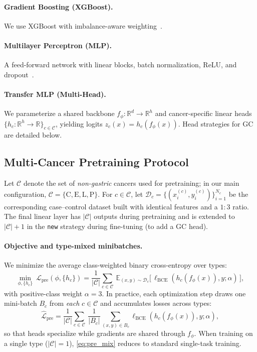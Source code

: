 \documentclass[journal,article,submit,pdftex,moreauthors]{Definitions/mdpi}
\begin{document}
\paragraph{Gradient Boosting (XGBoost).} We use XGBoost with imbalance-aware weighting~\citep{Chen2016_XGBoost}.

\paragraph{Multilayer Perceptron (MLP).} A feed-forward network with linear blocks, batch normalization, ReLU, and dropout~\citep{Ioffe2015_BN,Srivastava2014_Dropout}.

\paragraph{Transfer MLP (Multi-Head).}
We parameterize a shared backbone $f_\phi:\mathbb{R}^d\!\to\!\mathbb{R}^h$ and cancer-specific linear heads $\{h_c:\mathbb{R}^h\!\to\!\mathbb{R}\}_{c\in\mathcal{C}}$, yielding logits $z_c(x)=h_c(f_\phi(x))$. Head strategies for GC are detailed below.

\subsection{Multi-Cancer Pretraining Protocol}\label{sec:pretrain_multi}

Let $\mathcal{C}$ denote the set of \emph{non-gastric} cancers used for pretraining; in our main configuration, $\mathcal{C}=\{\mathrm{C},\mathrm{E},\mathrm{L},\mathrm{P}\}$. For $c\in\mathcal{C}$, let $\mathcal{D}_c=\{(x_i^{(c)},y_i^{(c)})\}_{i=1}^{N_c}$ be the corresponding case--control dataset built with identical features and a $1{:}3$ ratio. The final linear layer has $|\mathcal{C}|$ outputs during pretraining and is extended to $|\mathcal{C}|{+}1$ in the \texttt{new} strategy during fine-tuning (to add a GC head).

\paragraph{Objective and type-mixed minibatches.}
We minimize the average class-weighted binary cross-entropy over types:
\begin{equation}
\label{eq:pre_obj}
\min_{\phi,\{h_c\}}\ \mathcal{L}_{\mathrm{pre}}(\phi,\{h_c\})=\frac{1}{|\mathcal{C}|}\sum_{c\in\mathcal{C}} \ \mathbb{E}_{(x,y)\sim\mathcal{D}_c}\!\big[\,\ell_{\mathrm{BCE}}(h_c(f_\phi(x)),y;\alpha)\,\big],
\end{equation}
with positive-class weight $\alpha{=}3$. In practice, each optimization step draws one mini-batch $B_c$ from \emph{each} $c\in\mathcal{C}$ and accumulates losses across types:
\begin{equation}
\label{eq:pre_mix}
\hat{\mathcal{L}}_{\mathrm{pre}}=\frac{1}{|\mathcal{C}|}\sum_{c\in\mathcal{C}}\ \frac{1}{|B_c|}\sum_{(x,y)\in B_c}\ell_{\mathrm{BCE}}(h_c(f_\phi(x)),y;\alpha),
\end{equation}
so that heads specialize while gradients are shared through $f_\phi$. When training on a single type ($|\mathcal{C}|{=}1$), \eqref{eq:pre_mix} reduces to standard single-task training.
\end{document}
